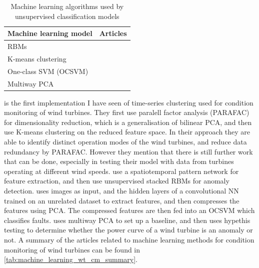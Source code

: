 \begin{table}[h]
    \centering
    \begin{tabular}{p{}p{}}
        \toprule
        Machine learning model & Articles \\
        \midrule
        RBMs                    & \cite{unsup_graphical_modeling_wt_cm} \\
        K-means clustering      & \cite{fault_detect_PARAFAC_k_means} \\
        One-class SVM (OCSVM)   & \cite{unsupervised_AD_blade_damage_deep_features_images} \\
        Multiway PCA            & \cite{multiway_PCA_multivar_inference_cm_wt} \\
        \bottomrule
    \end{tabular}
    \caption{Machine learning algorithms used by unsupervised classification models}
    \label{tab:sup_classification_ml_models}
\end{table}

\textcite{fault_detect_PARAFAC_k_means} is the first implementation I have seen of time-series clustering used for condition monitoring of wind turbines. They first use paralell factor analysis (PARAFAC) for dimensionality reduction, which is a generalisation of bilinear PCA, and then use K-means clustering on the reduced feature space. In their approach they are able to identify distinct operation modes of the wind turbines, and reduce data redundancy by PARAFAC. However they mention that there is still further work that can be done, especially in testing their model with data from turbines operating at different wind speeds. \textcite{unsup_graphical_modeling_wt_cm} use a spatiotemporal pattern network for feature extraction, and then use unsupervised stacked RBMs for anomaly detection. \textcite{unsupervised_AD_blade_damage_deep_features_images} uses images as input, and the hidden layers of a convolutional NN trained on an unrelated dataset to extract features, and then compresses the features using PCA. The compressed features are then fed into an OCSVM which classifies faults. \textcite{multiway_PCA_multivar_inference_cm_wt} uses multiway PCA to set up a baseline, and then uses hypethis testing to determine whether the power curve of a wind turbine is an anomaly or not. A summary of the articles related to machine learning methods for condition monitoring of wind turbines can be found in \ref{tab:machine_learning_wt_cm_summary}.

